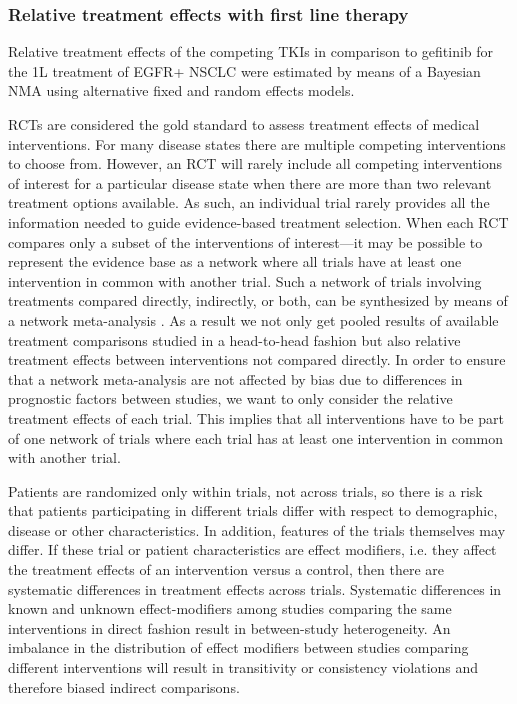 \documentclass[11pt,final,fleqn]{article}\usepackage[]{graphicx}\usepackage[]{color}
\theoremstyle{plain}
\begin{document}
{\subsubsection{Relative treatment effects with first line therapy}
Relative treatment effects of the competing TKIs in comparison to gefitinib for the 1L treatment of EGFR+ NSCLC were estimated by means of a Bayesian NMA using alternative fixed and random effects models. 

RCTs are considered the gold standard to assess treatment effects of medical interventions. For many disease states there are multiple competing interventions to choose from. However, an RCT will rarely include all competing interventions of interest for a particular disease state when there are more than two relevant treatment options available. As such, an individual trial rarely provides all the information needed to guide evidence-based treatment selection. When each RCT compares only a subset of the interventions of interest---it may be possible to represent the evidence base as a network where all trials have at least one intervention in common with another trial. Such a network of trials involving treatments compared directly, indirectly, or both, can be synthesized by means of a network meta-analysis \citep[Chapter~1]{dias2018network}. As a result we not only get pooled results of available treatment comparisons studied in a head-to-head fashion but also relative treatment effects between interventions not compared directly. In order to ensure that a network meta-analysis are not affected by bias due to differences in prognostic factors between studies, we want to only consider the relative treatment effects of each trial. This implies that all interventions have to be part of one network of trials where each trial has at least one intervention in common with another trial.  

Patients are randomized only within trials, not across trials, so there is a risk that patients participating in different trials differ with respect to demographic, disease or other characteristics. In addition, features of the trials themselves may differ. If these trial or patient characteristics are effect modifiers, i.e. they affect the treatment effects of an intervention versus a control, then there are systematic differences in treatment effects across trials. Systematic differences in known and unknown effect-modifiers among studies comparing the same interventions in direct fashion result in between-study heterogeneity. An imbalance in the distribution of effect modifiers between studies comparing different interventions will result in transitivity or consistency violations and therefore biased indirect comparisons.

}
\end{document}
